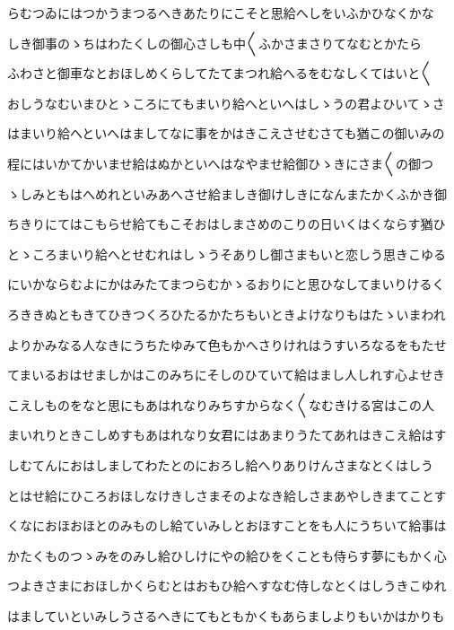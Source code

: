\documentclass[a4paper,11pt,landscape]{ltjtarticle}
\begin{document}
\par\medskip
らむつゐにはつかうまつるへきあたりにこそと思給へしをいふかひなくかな
\par\medskip
しき御事のゝちはわたくしの御心さしも中〱ふかさまさりてなむとかたら
\par\medskip
ふわさと御車なとおほしめくらしてたてまつれ給へるをむなしくてはいと〱
\par\medskip
おしうなむいまひとゝころにてもまいり給へといへはしゝうの君よひいてゝさ
\par\medskip
はまいり給へといへはましてなに事をかはきこえさせむさても猶この御いみの
\par\medskip
程にはいかてかいませ給はぬかといへはなやませ給御ひゝきにさま〱の御つ
\par\medskip
ゝしみともはへめれといみあへさせ給ましき御けしきになんまたかくふかき御
\par\medskip
ちきりにてはこもらせ給てもこそおはしまさめのこりの日いくはくならす猶ひ
\par\medskip
とゝころまいり給へとせむれはしゝうそありし御さまもいと恋しう思きこゆる
\par\medskip
にいかならむよにかはみたてまつらむかゝるおりにと思ひなしてまいりけるく
\par\medskip
ろききぬともきてひきつくろひたるかたちもいときよけなりもはたゝいまわれ
\par\medskip
よりかみなる人なきにうちたゆみて色もかへさりけれはうすいろなるをもたせ
\par\medskip
てまいるおはせましかはこのみちにそしのひていて給はまし人しれす心よせき
\par\medskip
こえしものをなと思にもあはれなりみちすからなく〱なむきける宮はこの人
\par\medskip
まいれりときこしめすもあはれなり女君にはあまりうたてあれはきこえ給はす
\par\medskip
しむてんにおはしましてわたとのにおろし給へりありけんさまなとくはしう
\par\medskip
とはせ給にひころおほしなけきしさまそのよなき給しさまあやしきまてことす
\par\medskip
くなにおほおほとのみものし給ていみしとおほすことをも人にうちいて給事は
\par\medskip
かたくものつゝみをのみし給ひしけにやの給ひをくことも侍らす夢にもかく心
\par\medskip
つよきさまにおほしかくらむとはおもひ給へすなむ侍しなとくはしうきこゆれ
\par\medskip
はましていといみしうさるへきにてもともかくもあらましよりもいかはかりも
\par\medskip
\end{document}
